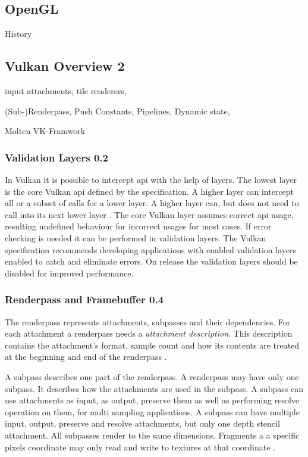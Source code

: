 \subsection{OpenGL}
History


\subsection{Vulkan Overview 2}

input attachments, tile renderers,

(Sub-)Renderpass, Push Constants, Pipelines, Dynamic state,

Molten VK-Framwork

\subsubsection{Validation Layers 0.2}

In Vulkan it is possible to intercept \gls{api} with the help of layers. The lowest layer is the core Vulkan \gls{api} defined by the specification. A higher layer can intercept all or a subset of calls for a lower layer. A higher layer can, but does not need to call into its next lower layer \cite{khronos:vulkan:spec1.1}.
The core Vulkan layer assumes correct \gls{api} usage, resulting undefined behaviour for incorrect usages for most cases. If error checking is needed it can be performed in validation layers. The Vulkan specification recommends developing applications with enabled validation layers enabled to catch and eliminate errors. On release the validation layers should be disabled for improved performance.

\subsubsection{Renderpass and Framebuffer 0.4}
\label{section:renderpass}

The renderpass represents attachments, subpasses and their dependencies. For each attachment a renderpass needs a \textit{attachment description}. This description contains the attachment's format, sample count and how its contents are treated at the beginning and end of the renderpass \cite{khronos:vulkan:spec1.1}.

A subpass describes  one part of the renderpass. A renderpass may have only one subpass. It describes how the attachments are used in the subpass. A subpass can use attachments as input, as output, preserve them as well as performing resolve operation on them, for multi sampling applications. A subpass can have multiple input, output, preserve and resolve attachments, but only one depth stencil attachment. All subpasses render to the same dimensions. Fragments a a specific pixels coordinate may only read and write to textures at that coordinate \cite{khronos:vulkan:spec1.1}.


